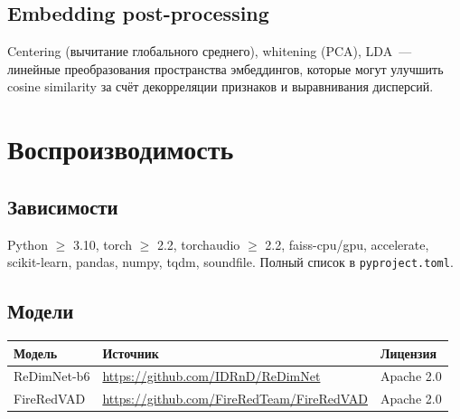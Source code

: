 \documentclass[12pt,a4paper]{article}
\begin{document}
\subsection{Embedding post-processing}

Centering (вычитание глобального среднего), whitening (PCA), LDA~--- линейные преобразования пространства эмбеддингов, которые могут улучшить cosine similarity за счёт декорреляции признаков и выравнивания дисперсий.

\section{Воспроизводимость}

\subsection{Зависимости}

Python $\geq$ 3.10, torch $\geq$ 2.2, torchaudio $\geq$ 2.2, faiss-cpu/gpu, accelerate, scikit-learn, pandas, numpy, tqdm, soundfile. Полный список в \texttt{pyproject.toml}.

\subsection{Модели}

\begin{tabular}{l l l}
\hline
Модель & Источник & Лицензия \\
\hline
ReDimNet-b6 & \url{https://github.com/IDRnD/ReDimNet} & Apache 2.0 \\
FireRedVAD & \url{https://github.com/FireRedTeam/FireRedVAD} & Apache 2.0 \\
\hline
\end{tabular}
\end{document}
